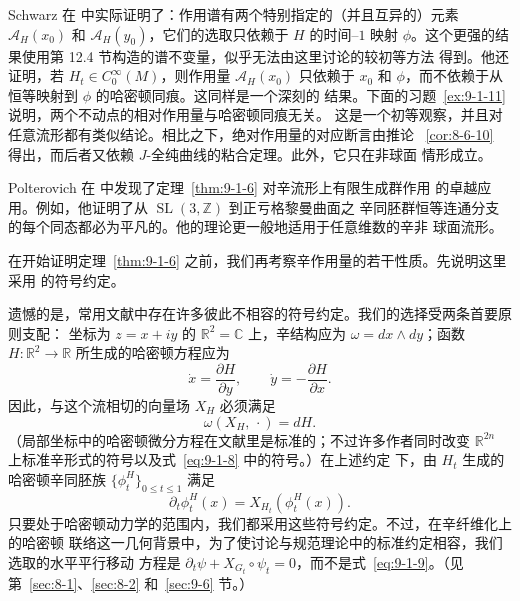 Schwarz 在  中实际证明了：作用谱有两个特别指定的（并且互异的）元素
$\mathcal A_H(x_0)$ 和 $\mathcal A_H(y_0)$，它们的选取只依赖于 $H$ 的时间--$1$ 映射
$\phi$。这个更强的结果使用第 12.4 节构造的谱不变量，似乎无法由这里讨论的较初等方法
得到。他还证明，若 $H_t\in C_0^\infty(M)$，则作用量 $\mathcal A_H(x_0)$ 只依赖于
$x_0$ 和 $\phi$，而不依赖于从恒等映射到 $\phi$ 的哈密顿同痕。这同样是一个深刻的
结果。下面的习题~\ref{ex:9-1-11} 说明，两个不动点的相对作用量与哈密顿同痕无关。
这是一个初等观察，并且对任意流形都有类似结论。相比之下，绝对作用量的对应断言由推论
~\ref{cor:8-6-10} 得出，而后者又依赖 $J$-全纯曲线的粘合定理。此外，它只在非球面
情形成立。

Polterovich 在  中发现了定理~\ref{thm:9-1-6} 对辛流形上有限生成群作用
的卓越应用。例如，他证明了从 $\operatorname{SL}(3,\mathbb Z)$ 到正亏格黎曼曲面之
辛同胚群恒等连通分支的每个同态都必为平凡的。他的理论更一般地适用于任意维数的辛非
球面流形。

在开始证明定理~\ref{thm:9-1-6} 之前，我们再考察辛作用量的若干性质。先说明这里采用
的符号约定。

\begin{remark}[符号约定]\label{rem:9-1-7}
遗憾的是，常用文献中存在许多彼此不相容的符号约定。我们的选择受两条首要原则支配：
坐标为 $z=x+iy$ 的 $\mathbb R^2=\mathbb C$ 上，辛结构应为
$\omega=dx\wedge dy$；函数 $H:\mathbb R^2\to\mathbb R$ 所生成的哈密顿方程应为
\[
  \dot x=\frac{\partial H}{\partial y},
  \qquad
  \dot y=-\frac{\partial H}{\partial x}.
\]
因此，与这个流相切的向量场 $X_H$ 必须满足
\begin{equation}\label{eq:9-1-8}
  \omega(X_H,\,\cdot)=dH.
\end{equation}
（局部坐标中的哈密顿微分方程在文献里是标准的；不过许多作者同时改变
$\mathbb R^{2n}$ 上标准辛形式的符号以及式~\eqref{eq:9-1-8} 中的符号。）在上述约定
下，由 $H_t$ 生成的哈密顿辛同胚族 $\{\phi_t^H\}_{0\le t\le1}$ 满足
\begin{equation}\label{eq:9-1-9}
  \partial_t\phi_t^H(x)=X_{H_t}(\phi_t^H(x)).
\end{equation}
只要处于哈密顿动力学的范围内，我们都采用这些符号约定。不过，在辛纤维化上的哈密顿
联络这一几何背景中，为了使讨论与规范理论中的标准约定相容，我们选取的水平平行移动
方程是 $\partial_t\psi+X_{G_t}\circ\psi_t=0$，而不是式~\eqref{eq:9-1-9}。（见
第~\ref{sec:8-1}、\ref{sec:8-2} 和~\ref{sec:9-6} 节。）
\end{remark}

